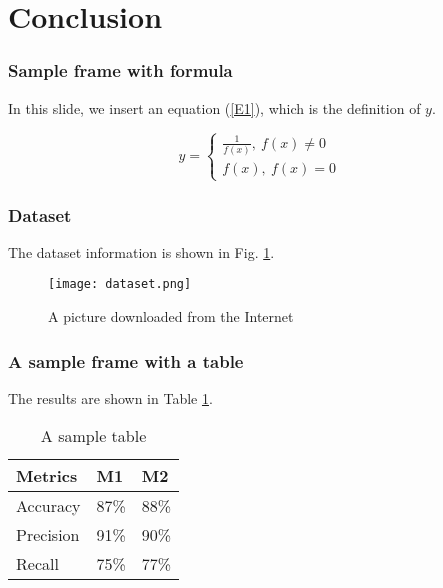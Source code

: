 \documentclass[14pt]{beamer}
\begin{document}
\section{Conclusion}

\begin{frame}
\frametitle{Sample frame with formula}

In this slide, we insert an equation (\ref{E1}), which is the definition of $y$.

\begin{equation}
\label{E1}
y=
\begin{cases}
\frac{1}{f(x)},\ f(x) \neq 0 \\
f(x), \ f(x)=0
\end{cases}
\end{equation}

\end{frame}



\begin{frame}
\frametitle{Dataset}

The dataset information is shown in Fig. \ref{dataset}.

\begin{figure}[ht]
\centering
\texttt{[image: dataset.png]}
\caption{A picture downloaded from the Internet} 
\label{dataset}
\end{figure}

\end{frame}


\begin{frame}
\frametitle{A sample frame with a table}

The results are shown in Table \ref{T1}.

\begin{table}[ht]
\caption{A sample table}
\label{T1}
\centering
\begin{tabular}{p{1.5cm}|p{1.5cm}|p{1.5cm}}
\hline
Metrics   &   M1 &	M2	\\
\hline
Accuracy  &  87\% &	88\%	\\
Precision &  91\% &	90\%	\\
Recall	  & 75\% &	77\%	\\
\hline
\end{tabular}
\end{table}

\end{frame}
\end{document}
